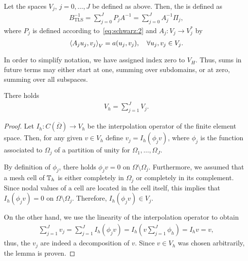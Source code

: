 \begin{definition}
  Let the spaces $V_j$, $j=0,\dots,J$ be defined as above. Then, the
   is defined as
  \begin{gather}
    \label{eq:schwarz:10}
    B^{-1}_{\text{TLS}} = \sum_{j=0}^J P_j A^{-1} = \sum_{j=0}^J A_j^{-1} \Pi_j,
  \end{gather}
  where $P_j$ is defined according to~\eqref{eq:schwarz:2} and $A_j:
  V_j\to V_j^*$ by
  \begin{gather}
    \scal(A_j u_j, v_j)_V = a(u_j, v_j),\quad\forall u_j, v_j \in V_j.
  \end{gather}
\end{definition}

\begin{note}
  In order to simplify notation, we have assigned index zero to
  $V_H$. Thus, sums in future terms may either start at one, summing
  over subdomains, or at zero, summing over all subspaces.
\end{note}

\begin{lemma}
  \label{lemma:schwarz:4}
  There holds
  \begin{gather}
    \label{eq:schwarz:11}
    V_h = \sum_{j=1}^J V_j.
  \end{gather}
\end{lemma}

\begin{proof}
  Let $I_h: C(\overline\Omega) \to V_h$ be the interpolation operator
  of the finite element space. Then, for any given $v\in V_h$ define
  $v_j = I_h(\phi_j v)$, where $\phi_j$ is the function associated to
  $\Omega_j$ of a partition of unity for $\Omega_1,\dots,\Omega_J$.
  
  By definition of $\phi_j$, there holds $\phi_j v = 0$ on
  $\Omega\setminus\Omega_j$. Furthermore, we assumed that a mesh cell
  of $\mathbb T_h$ is either completely in $\Omega_j$ or completely in its
  complement. Since nodal values of a cell are located in the cell
  itself, this implies that $I_h (\phi_j v) = 0$ on
  $\Omega\setminus\Omega_j$. Therefore, $I_h (\phi_j v) \in V_j$.
  
  On the other hand, we use the linearity of the interpolation
  operator to obtain
  \begin{gather*}
    \sum_{j=1}^J v_j = \sum_{j=1}^J I_h(\phi_j v)
    = I_h\left(v\sum_{j=1}^J \phi_h\right)
    = I_h v = v,
  \end{gather*}
  thus, the $v_j$ are indeed a decomposition of $v$. Since $v\in V_h$
  was chosen arbitrarily, the lemma is proven.
\end{proof}


